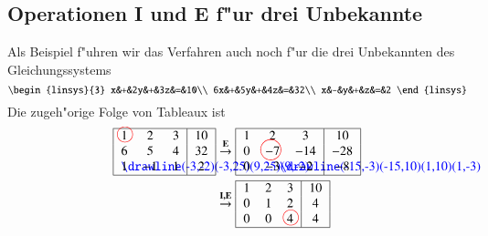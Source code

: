 \subsection{Operationen I und E f"ur drei Unbekannte}
Als Beispiel f"uhren wir das Verfahren auch noch f"ur die drei Unbekannten
des Gleichungssystems
\begin{equation}
\begin{linsys}{3}
x&+&2y&+&3z&=&10\\
6x&+&5y&+&4z&=&32\\
x&-&y&+&z&=&2
\end{linsys}
\end{equation}
Die zugeh"orige Folge von Tableaux ist
\begin{align*}
\begin{tabular}{|>{$}c<{$}>{$}c<{$}>{$}c<{$}|>{$}c<{$}|}
\hline
\begin{picture}(0,0)
\color{red}\put(3,4){\circle{12}}
\end{picture}%
1&2&3&10\\
6&5&4&32\\
\begin{picture}(0,0)
\color{blue}\drawline(-3,-2)(-3,25)(9,25)(9,-2)
\end{picture}%
1&-1&1&2\\
\hline
\end{tabular}
&\overset{\text{\bf E}}\rightarrow
\begin{tabular}{|>{$}c<{$}>{$}c<{$}>{$}c<{$}|>{$}c<{$}|}
\hline
1&2&3&10\\
0&-7%
\begin{picture}(0,0)
\color{red}\put(-7,4){\circle{17}}
\end{picture}%
&-14&-28\\
0&-3%
\begin{picture}(0,0)
\color{blue}\drawline(-15,-3)(-15,10)(1,10)(1,-3)
\end{picture}%
&-2&-8\\
\hline
\end{tabular}
\\
&\overset{\text{\bf I,E}}\rightarrow
\begin{tabular}{|>{$}c<{$}>{$}c<{$}>{$}c<{$}|>{$}c<{$}|}
\hline
1&2&3&10\\
0&1&2&4\\
0&0&\begin{picture}(0,0)
\color{red}\put(3,4){\circle{12}}
\end{picture}%
4&4\\
\hline
\end{tabular}

\end{align*}
